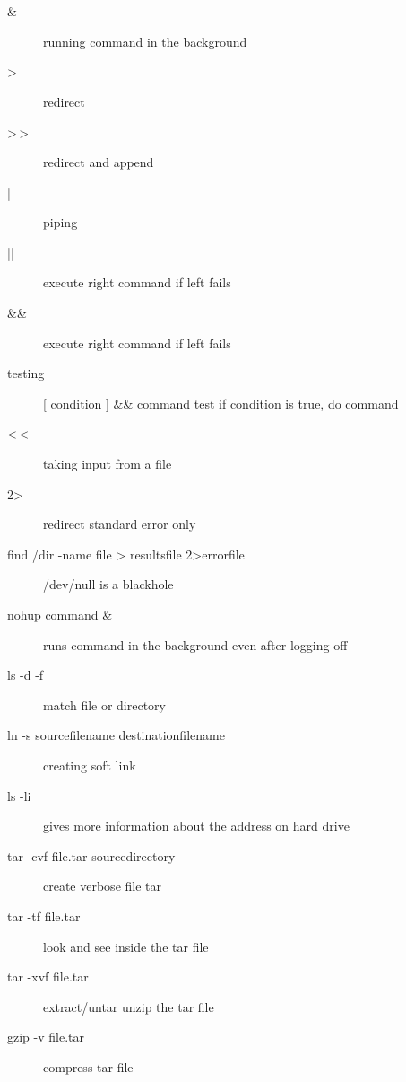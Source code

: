 \documentclass[12pt,a4paper]{report}
\begin{document}
\section{\color{Magenta}{General}\\}
\begin{description}
\item[\&] running command in the background  \\
\item[>] redirect  \\
\item[>\,>] redirect and append  \\
\item[|] piping  \\
\item[||] execute right command if left fails  \\
\item[\&\&] execute right command if left fails   \\
\item[testing] [ condition ] \&\& command test if condition is true, do command \\
\item[<\,<] taking input from a file  \\
\item[2>] redirect standard error only  \\
\item[find /dir -name file > resultsfile 2>errorfile] /dev/null is a blackhole  \\
\item[nohup command \&] runs command in the background even after logging off  \\
\item[ls -d -f] match file or directory  \\
\item[ln -s sourcefilename destinationfilename] creating soft link  \\
\item[ ls -li] gives more information about the address on hard drive  \\
\item[tar -cvf file.tar sourcedirectory] create verbose file tar  \\
\item[tar -tf file.tar] look and see inside the tar file  \\
\item[tar -xvf file.tar] extract/untar unzip the tar file  \\
\item[gzip -v file.tar] compress tar file  \\

\end{description}
\end{document}
